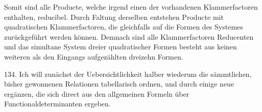 Somit sind alle Producte, welche irgend einen der vorhandenen Klammerfactoren  enthalten, reducibel. Durch Faltung derselben entstehen Producte mit quadratischen Klammerfactoren, die gleichfalls auf die Formen des Systemes zur\"uckgef\"uhrt werden k\"onnen. Demnach sind alle Klammerfactoren Reducenten und das simultane System dreier quadratischer Formen besteht aus keinen weiteren als den Eingangs aufgez\"ahlten dreizehn Formen.

134.  Ich will zun\"achst der Uebersichtlichkeit halber wiederum die s\"ammtlichen, bisher gewonnenen Relationen tabellarisch ordnen, und durch einige neue erg\"anzen, die sich direct aus den allgemeinen Formeln \"uber Functionaldeterminanten ergeben.

